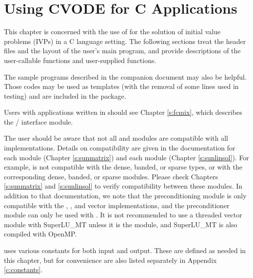 \chapter{Using CVODE for C Applications}\label{s:simulation}

This chapter is concerned with the use of {\cvode} for the solution of
initial value problems (IVPs) in a C language setting.  The following
sections treat the header files and the layout of the user's main
program, and provide descriptions of the {\cvode} user-callable
functions and user-supplied functions.

The sample programs described in the companion document \cite{cvode_ex}
may also be helpful.  Those codes may be used as templates (with the removal
of some lines used in testing) and are included in the {\cvode} package.

Users with applications written in {\F} should see Chapter \ref{s:fcmix},
which describes the {\F}/{\CC} interface module.

The user should be aware that not all {\sunlinsol} and {\sunmatrix}
modules are compatible with all {\nvector} implementations.
Details on compatibility are given in the documentation for each
{\sunmatrix} module (Chapter \ref{s:sunmatrix}) and each {\sunlinsol}
module (Chapter \ref{s:sunlinsol}). For example, {\nvecp} is not
compatible with the dense, banded, or sparse {\sunmatrix} types, or with
the corresponding dense, banded, or sparse {\sunlinsol} modules.  Please
check Chapters \ref{s:sunmatrix} and \ref{s:sunlinsol} to verify
compatibility between these modules.  In addition to that
documentation, we note that the {\cvbandpre} preconditioning module is
only compatible with the {\nvecs}, {\nvecopenmp}, and {\nvecpthreads}
vector implementations, and the preconditioner module {\cvbbdpre}
can only be used with {\nvecp}.
It is not recommended to use a threaded vector module with SuperLU\_MT
unless it is the {\nvecopenmp} module, and SuperLU\_MT is also compiled
with OpenMP.

{\cvode} uses various constants for both input and output.  These are
defined as needed in this chapter, but for convenience are also listed
separately in Appendix \ref{c:constants}.

